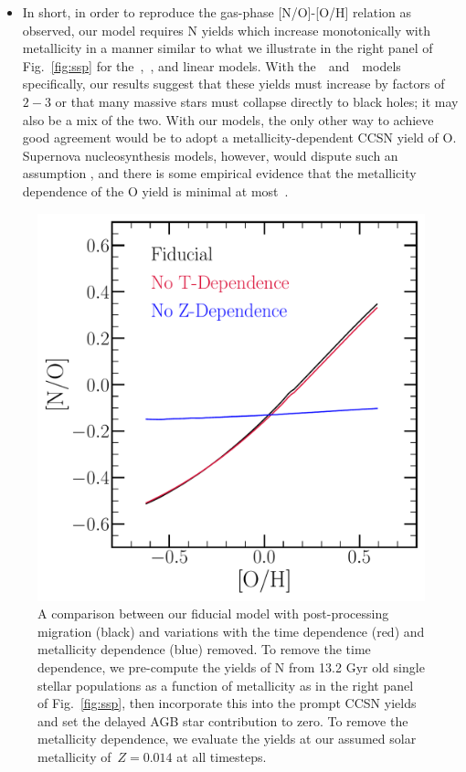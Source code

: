 \documentclass[ms.tex]{subfiles}
\begin{document}
\begin{itemize}
\begin{itemize}
	\end{itemize} 

	\item In short, in order to reproduce the gas-phase [N/O]-[O/H]
	relation as observed, our model requires N yields which increase
	monotonically with metallicity in a manner similar to what we illustrate
	in the right panel of Fig.~\ref{fig:ssp} for the~\cristallo,~\ventura,
	and linear models.
	With the~\cristallo~and~\ventura~models specifically, our results
	suggest that these yields must increase by factors of~$2 - 3$ or that
	many massive stars must collapse directly to black holes; it may also
	be a mix of the two.
	With our models, the only other way to achieve good agreement would be to
	adopt a metallicity-dependent CCSN yield of O.
	Supernova nucleosynthesis models, however, would dispute such an assumption
	\citep[e.g.][]{Woosley1995, Nomoto2013, Limongi2018}, and there is some
	empirical evidence that the metallicity dependence of the O yield is minimal
	at most~\citep{Weinberg2019, Weinberg2021}.

\end{itemize} 

\begin{figure}
\centering
\includegraphics[scale = 0.45]{t_z_dep_comp.pdf}
\caption{
A comparison between our fiducial model with post-processing migration (black)
and variations with the time dependence (red) and metallicity dependence (blue)
removed.
To remove the time dependence, we pre-compute the yields of N from 13.2 Gyr old
single stellar populations as a function of metallicity as in the right panel
of Fig.~\ref{fig:ssp}, then incorporate this into the prompt CCSN yields and
set the delayed AGB star contribution to zero.
To remove the metallicity dependence, we evaluate the yields at our assumed
solar metallicity of~$Z = 0.014$ at all timesteps.
}
\label{fig:t_z_dep_comp}
\end{figure}
\end{document}
